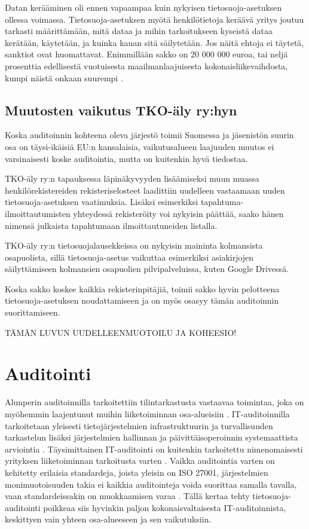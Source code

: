 \documentclass[finnish]{tktltiki}
\begin{document}
Datan kerääminen oli ennen vapaampaa kuin nykyisen tietosuoja-asetuksen ollessa voimassa. Tietosuoja-asetuksen myötä henkilötietoja keräävä yritys joutuu tarkasti määrittämään, mitä dataa ja mihin tarkoitukseen kyseistä dataa kerätään, käytetään, ja kuinka kauan sitä säilytetään. Jos näitä ehtoja ei täytetä, sanktiot ovat huomattavat. Enimmillään sakko on 20 000 000 euroa, tai neljä prosenttia edellisestä vuotuisesta maailmanlaajuisesta kokonaisliikevaihdosta, kumpi näistä onkaan suurempi \cite{eu2016}. 

\subsection{Muutosten vaikutus TKO-äly ry:hyn}

Koska auditoinnin kohteena oleva järjestö toimii Suomessa ja jäsenistön suurin osa on täysi-ikäisiä EU:n kansalaisia, vaikutusalueen laajuuden muutos ei varsinaisesti koske auditointia, mutta on kuitenkin hyvä tiedostaa.

TKO-äly ry:n tapauksessa läpinäkyvyyden lisäämiseksi muun muassa henkilörekistereiden rekisteriselosteet laadittiin uudelleen vastaamaan uuden tietosuoja-asetuksen vaatimuksia. Lisäksi esimerkiksi tapahtuma-ilmoittautumisten yhteydessä rekisteröity voi nykyisin päättää, saako hänen nimensä julkaista tapahtumaan ilmoittautuneiden listalla.

TKO-äly ry:n tietosuojalausekkeissa on nykyisin maininta kolmansista osapuolista, sillä tietosuoja-asetus vaikuttaa esimerkiksi asiakirjojen säilyttämiseen kolmansien osapuolien pilvipalveluissa, kuten Google Drivessä.

Koska sakko koskee kaikkia rekisterinpitäjiä, toimii sakko hyvin pelotteena tietosuoja-asetuksen noudattamiseen ja on myös osasyy tämän auditoinnin suorittamiseen.

TÄMÄN LUVUN UUDELLEENMUOTOILU JA KOHEESIO!

\newpage
\section{Auditointi}

Alunperin auditoinnilla tarkoitettiin tilintarkastusta vastaavaa toimintaa, joka on myöhemmin laajentunut muihin liiketoiminnan osa-alueisiin \cite{aditya,felley}. IT-auditoinnilla tarkoitetaan yleisesti tietojärjestelmien infrastruktuurin ja turvallisuuden tarkastelun lisäksi järjestelmien hallinnan ja päivittäisoperoinnin systemaattista arviointia \cite{felley}. Täysimittainen IT-auditointi on kuitenkin tarkoitettu nimenomaisesti yrityksen liiketoiminnan tarkoitusta varten \cite{aditya}. Vaikka auditointia varten on kehitetty erilaisia standardeja, joista yleisin on ISO 27001, järjestelmien monimuotoisuuden takia ei kaikkia auditointeja voida suorittaa samalla tavalla, vaan standardeissakin on muokkaamisen varaa \cite{dimond,felley}. Tällä kertaa tehty tietosuoja-auditointi poikkeaa siis hyvinkin paljon kokonaisvaltaisesta IT-auditoinnista, keskittyen vain yhteen osa-alueeseen ja sen vaikutuksiin. 
\end{document}
